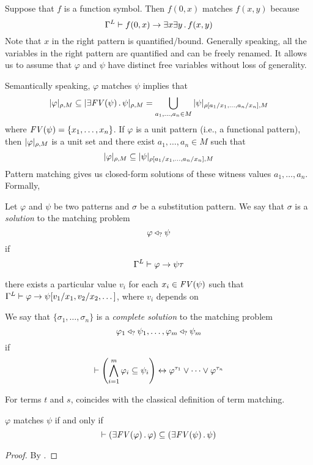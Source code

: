\documentclass{article}
\begin{document}
\begin{example}
Suppose that $f$ is a function symbol.
Then $f(0, x)$ matches $f(x,y)$ because
\[\Gamma^L \vdash f(0,x) \rightarrow \exists x \exists y \,.\, f(x,y)\]
Note that $x$ in the right pattern is quantified/bound.
Generally speaking, all the variables in the right pattern are quantified
and can be freely renamed. 
It allows us to assume that $\varphi$ and $\psi$ have distinct free variables
without loss of generality. 
\end{example}

Semantically speaking, 
$\varphi$ matches $\psi$ implies that
\[|\varphi|_{\rho,M} \subseteq |\exists \mathit{FV(\psi)} \,.\, \psi|_{\rho,M}
= \bigcup_{a_1,\dots,a_n \in M} |\psi|_{\rho[a_1/x_1,\dots,a_n/x_n],M}
\]
where $\mathit{FV(\psi)} = \{x_1,\dots,x_n\}$.
If $\varphi$ is a unit pattern (i.e., a functional pattern),
then $|\varphi|_{\rho,M}$ is a unit set and there exist
$a_1,\dots,a_n \in M$ such that
\[|\varphi|_{\rho,M} \subseteq |\psi|_{\rho[a_1/x_1,\dots,a_n/x_n],M}
\]
Pattern matching gives us closed-form solutions of
these witness values $a_1,\dots,a_n$. 
Formally,

\begin{definition}
Let $\varphi$ and $\psi$ be two patterns
and $\sigma$ be a substitution pattern. 
We say that $\sigma$ is a \emph{solution} to the matching problem
\[\varphi \triangleleft_? \psi\]
if
\[\Gamma^L \vdash \varphi \rightarrow \psi\tau\]
\end{definition}

there exists a particular value $v_i$ for each $x_i \in \mathit{FV(\psi)}$ such that
$\Gamma^L \vdash \varphi \rightarrow \psi[v_1/x_1, v_2/x_2,\dots]$,
where $v_i$ depends on 

\begin{definition}
We say that $\{\sigma_1,\dots,\sigma_n\}$ is a \emph{complete solution}
to the matching problem
\[\varphi_1 \triangleleft_? \psi_1, \dots, \varphi_m \triangleleft_? \psi_m\] if
\[\vdash \left(\bigwedge_{i=1}^m \varphi_i \subseteq \psi_i \right)
  \leftrightarrow \varphi^{\tau_1} \lor \dots \lor \varphi^{\tau_n}
\]
\end{definition}

\begin{proposition}
For terms $t$ and $s$,
 coincides with the classical definition of term matching.
\end{proposition}

\begin{proposition}
$\varphi$ matches $\psi$ if and only if
\[\vdash \left(\exists \mathit{FV(\varphi)} \,.\, \varphi\right)
  \subseteq \left(\exists \mathit{FV(\psi)} \,.\, \psi\right)
\]
\end{proposition}
\begin{proof}
By .
\end{proof}
\end{document}
